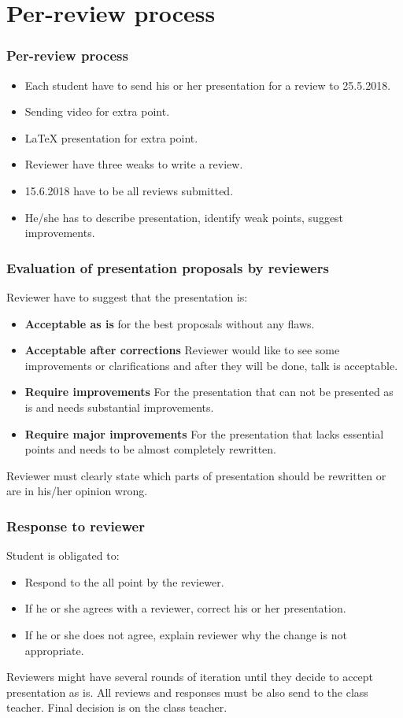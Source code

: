 \section{Per-review process}
\begin{frame}
\frametitle{Per-review process}
\begin{itemize}
\item Each student have to send his or her presentation for a review to 25.5.2018.
\item Sending video for extra point.
\item LaTeX presentation for extra point.
\item Reviewer have three weaks to write a review.
\item 15.6.2018 have to be all reviews submitted.
\item He/she has to describe presentation, identify weak points, suggest improvements.
\end{itemize}
\end{frame}

\begin{frame}
\frametitle{Evaluation of presentation proposals by reviewers}
Reviewer have to suggest that the presentation is:
\begin{itemize}
\item \textbf{Acceptable as is} for the best proposals without any flaws.
\item \textbf{Acceptable after corrections} Reviewer would like to see some improvements or clarifications and after they will be done, talk is acceptable.
\item \textbf{Require improvements} For the presentation that can not be presented as is and needs substantial improvements.
\item \textbf{Require major improvements} For the presentation that lacks essential points and needs to be almost completely rewritten.
\end{itemize}
Reviewer must clearly state which parts of presentation should be rewritten or are in his/her opinion wrong.
\end{frame}


\begin{frame}
\frametitle{Response to reviewer}
Student is obligated to:
\begin{itemize}
\item Respond to the all point by the reviewer.
\item If he or she agrees with a reviewer, correct his or her presentation.
\item If he or she does not agree, explain reviewer why the change is not appropriate.
\end{itemize}
Reviewers might have several rounds of iteration until they decide to accept presentation as is. All reviews and responses must be also send to the class teacher. Final decision is on the class teacher.
\end{frame}
